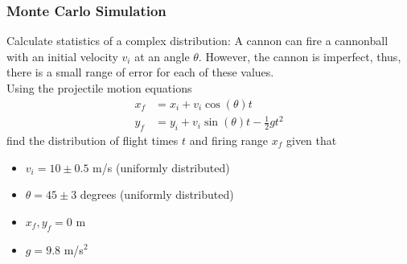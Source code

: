 \documentclass{beamer}
\begin{document}
\begin{frame}	
	\frametitle{Monte Carlo Simulation}
	
	\begin{exampleblock}{Calculate statistics of a complex distribution:}
		\small
		A cannon can fire a cannonball with an initial velocity $v_i$ at an angle $\theta$. However, the cannon is imperfect, thus, there is a small range of error for each of these values. \\[10pt]
		
		Using the projectile motion equations
		\begin{align*}
			x_f & = x_i + v_i \cos(\theta) t \\
			y_f & = y_i + v_i \sin(\theta) t - \frac{1}{2}gt^2
		\end{align*}
		find the distribution of flight times $t$ and firing range $x_f$ given that
		\begin{itemize}
			\small
			\item $v_i = 10 \pm 0.5$ m/s (uniformly distributed)
			\item $\theta = 45 \pm 3$ degrees (uniformly distributed)
			\item $x_f,y_f = 0$ m
			\item $g = 9.8$ m/s$^2$
		\end{itemize}
	\end{exampleblock}
	
\end{frame}
\end{document}
